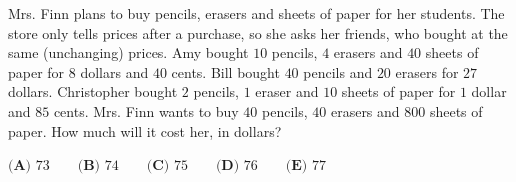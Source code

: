 Mrs. Finn plans to buy pencils, erasers and sheets of paper for her students. The store only tells prices after a purchase, so she asks her friends, who bought at the same (unchanging) prices. Amy bought $10$ pencils, $4$ erasers and $40$ sheets of paper for $8$ dollars and $40$ cents. Bill bought $40$ pencils and $20$ erasers for $27$ dollars. Christopher bought $2$ pencils, $1$ eraser and $10$ sheets of paper for $1$ dollar and $85$ cents. Mrs. Finn wants to buy $40$ pencils, $40$ erasers and $800$ sheets of paper. How much will it cost her, in dollars?

$\textbf{(A) }73\qquad\textbf{(B) }74\qquad\textbf{(C) }75\qquad\textbf{(D) }76\qquad\textbf{(E) }77$
